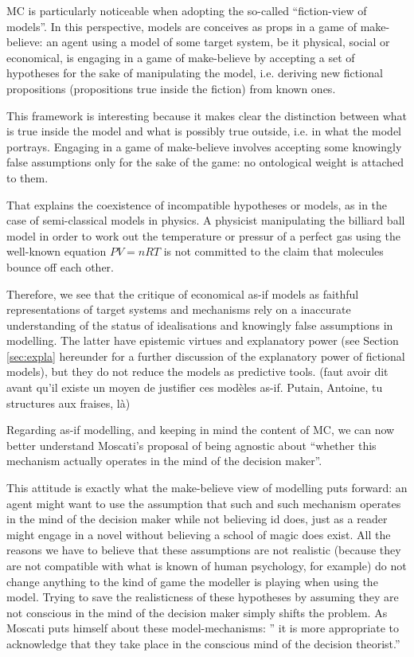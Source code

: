 \documentclass[a4paper,11pt]{article}
\theoremstyle{definition}
\begin{document}
MC is particularly noticeable when adopting the so-called ``fiction-view of models''. In this perspective, models are conceives as props in a game of make-believe: an agent using a model of some target system, be it physical, social or economical, is engaging in a game of make-believe by accepting a set of hypotheses for the sake of manipulating the model, i.e. deriving new fictional propositions (propositions true inside the fiction) from known ones.

This framework is interesting because it makes clear the distinction between what is true inside the model and what is possibly true outside, i.e. in what the model portrays. Engaging in a game of make-believe involves accepting some knowingly false assumptions only for the sake of the game: no ontological weight is attached to them.

That explains the coexistence of incompatible hypotheses or models, as in the case of semi-classical models in physics. A physicist manipulating the billiard ball model in order to work out the temperature or pressur of a perfect gas using the well-known equation $PV=nRT$ is not committed to the claim that molecules bounce off each other.

Therefore, we see that the critique of economical as-if models as faithful representations of target systems and mechanisms rely on a inaccurate understanding of the status of idealisations and knowingly false assumptions in modelling. The latter have epistemic virtues and explanatory power (see Section \ref{sec:expla} hereunder for a further discussion of the explanatory power of fictional models), but they do not reduce the models as predictive tools. (faut avoir dit avant qu'il existe un moyen de justifier ces modèles as-if. Putain, Antoine, tu structures aux fraises, là)

Regarding as-if modelling, and keeping in mind the content of MC, we can now better understand Moscati's proposal of being agnostic about ``whether this mechanism actually operates in the mind of the decision maker''. \citep[p.~2]{Moscati2023}

This attitude is exactly what the make-believe view of modelling puts forward: an agent might want to use the assumption that such and such mechanism operates in the mind of the decision maker while not believing id does, just as a reader might engage in a novel without believing a school of magic does exist. All the reasons we have to believe that these assumptions are not realistic (because they are not compatible with what is known of human psychology, for example) do not change anything to the kind of game the modeller is playing when using the model. Trying to save the realisticness of these hypotheses by assuming they are not conscious in the mind of the decision maker simply shifts the problem. As Moscati puts himself about these model-mechanisms: '' it is more appropriate to acknowledge that they take place in the conscious mind of the decision theorist.'' \citep[p.~12]{Moscati2023}
\end{document}
